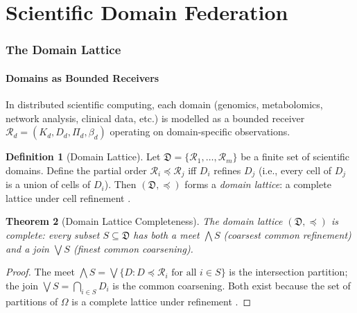 \documentclass[twocolumn,11pt,a4paper]{article}
\theoremstyle{plain}
\newtheorem{theorem}{Theorem}[section]
\theoremstyle{definition}
\newtheorem{definition}[theorem]{Definition}
\theoremstyle{remark}
\begin{document}
\part{Scientific Domain Federation}

\section{The Domain Lattice}
\label{sec:domain_lattice}

\subsection{Domains as Bounded Receivers}

In distributed scientific computing, each domain (genomics, metabolomics, network analysis, clinical data, etc.) is modelled as a bounded receiver $\mathcal{R}_d = (K_d, D_d, \Pi_d, \beta_d)$ operating on domain-specific observations.

\begin{definition}[Domain Lattice]
\label{def:domain_lattice}
Let $\mathfrak{D} = \{\mathcal{R}_1, \ldots, \mathcal{R}_m\}$ be a finite set of scientific domains.  Define the partial order $\mathcal{R}_i \preceq \mathcal{R}_j$ iff $D_i$ refines $D_j$ (i.e., every cell of $D_j$ is a union of cells of $D_i$).  Then $(\mathfrak{D}, \preceq)$ forms a \emph{domain lattice}: a complete lattice under cell refinement \citep{davey2002}.
\end{definition}

\begin{theorem}[Domain Lattice Completeness]
\label{thm:lattice}
The domain lattice $(\mathfrak{D}, \preceq)$ is complete: every subset $S \subseteq \mathfrak{D}$ has both a meet $\bigwedge S$ (coarsest common refinement) and a join $\bigvee S$ (finest common coarsening).
\end{theorem}

\begin{proof}
The meet $\bigwedge S = \bigvee\{D : D \preceq \mathcal{R}_i \text{ for all } i\in S\}$ is the intersection partition; the join $\bigvee S = \bigcap_{i\in S}D_i$ is the common coarsening.  Both exist because the set of partitions of $\Omega$ is a complete lattice under refinement \citep{davey2002}.
\end{proof}
\end{document}
